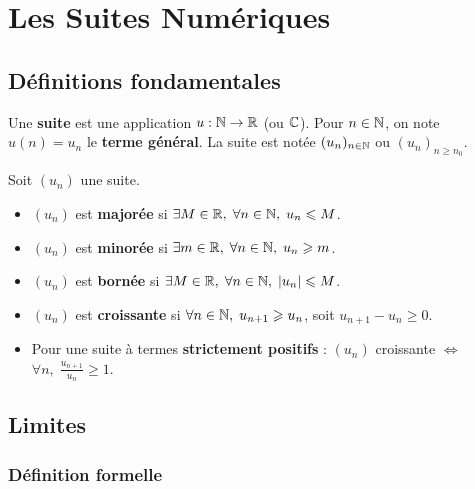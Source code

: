 \chapter{Les Suites Numériques}

\section{Définitions fondamentales}

\begin{defbox}
Une \textbf{suite} est une application $u : \mathbb{N} \to \mathbb{R}$ (ou $\mathbb{C}$). Pour $n \in \mathbb{N}$, on note $u(n) = u_n$ le \textbf{terme général}. La suite est notée $(u_n)_{n \in \mathbb{N}}$ ou $(u_n)_{n \geqslant n_0}$.
\end{defbox}

\begin{defbox}[--- Bornitude]
Soit $(u_n)$ une suite.
\begin{itemize}[leftmargin=1cm]
  \item $(u_n)$ est \textbf{majorée} si $\exists M \in \mathbb{R},\; \forall n \in \mathbb{N},\; u_n \leqslant M$.
  \item $(u_n)$ est \textbf{minorée} si $\exists m \in \mathbb{R},\; \forall n \in \mathbb{N},\; u_n \geqslant m$.
  \item $(u_n)$ est \textbf{bornée} si $\exists M \in \mathbb{R},\; \forall n \in \mathbb{N},\; |u_n| \leqslant M$.
\end{itemize}
\end{defbox}

\begin{defbox}[--- Monotonie]
\begin{itemize}[leftmargin=1cm]
  \item $(u_n)$ est \textbf{croissante} si $\forall n \in \mathbb{N},\; u_{n+1} \geqslant u_n$, soit $u_{n+1} - u_n \geqslant 0$.
  \item Pour une suite à termes \textbf{strictement positifs} : $(u_n)$ croissante $\Leftrightarrow$ $\forall n,\; \frac{u_{n+1}}{u_n} \geqslant 1$.
\end{itemize}
\end{defbox}


\section{Limites}

\subsection{Définition formelle}

